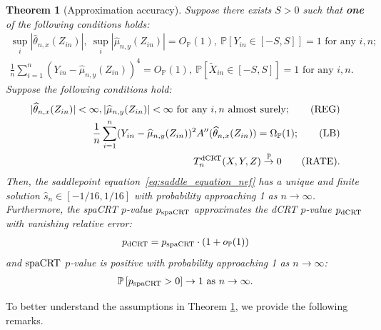\documentclass[12pt]{article}
\newtheorem{theorem}{Theorem}
\theoremstyle{definition}
\def\P{\mathbb{P}}
\def\P{\mathbb{P}}
\renewcommand{\P}{\mathbb{P}}							%
\newcommand{\convp}{\overset{\mathbb{P}}{\rightarrow}}             %
\newcommand{\srx}{X}									%
\newcommand{\srz}{Z}									%
\newcommand{\srxk}{\widetilde X}						%
\newcommand{\sry}{Y}									%
\newcommand{\dCRT}{\textnormal{dCRT}} 					%
\newcommand{\spacrt}{\textnormal{spaCRT}}               %
\begin{document}
\begin{theorem}[Approximation accuracy]\label{thm:validity_spacrt}
  Suppose there exists $S>0$ such that \textbf{one} of the following conditions holds:
  \begin{align}
    \sup_{i}|\widehat{\theta}_{n,x}(\srz_{in})|,\ \sup_{i}|\widehat{\mu}_{n,y}(\srz_{in})| = O_{\P}(1),\  \P[\sry_{in}\in [-S,S]]=1\text{ for any }i,n\label{eq:cse_assumption}\tag{CSE};\\
    \frac{1}{n}\sum_{i=1}^n (\sry_{in}-\widehat{\mu}_{n,y}(\srz_{in}))^4=O_{\P}(1),\ \P\left[\srxk_{in}\in [-S,S]\right]=1\text{ for any }i,n\label{eq:ccs_assumption}\tag{CCS}.
  \end{align}
	Suppose the following conditions hold:
	\begin{align}
		|\widehat \theta_{n,x}(\srz_{in})|<\infty,|\widehat \mu_{n,y}(\srz_{in})|<\infty\text{ for any $i,n$ almost surely};\label{eq:upper_bound_theta_a} \tag{REG}\\
		\frac{1}{n}\sum_{i=1}^n (Y_{in}-\widehat{\mu}_{n,y}(Z_{in}))^2 A''(\widehat \theta_{n,x}(\srz_{in}))=\Omega_{\P}(1);\label{eq:lower_bound_spacrt}\tag{LB}\\
		T_n^{\dCRT}(\srx,\sry,\srz)\convp 0\label{eq:x_n_convergence_spacrt}\tag{RATE}.
	\end{align}
	Then, the saddlepoint equation~\eqref{eq:saddle_equation_nef} has a unique and finite solution $\hat s_n \in [-1/16, 1/16]$ with probability approaching 1 as $n \rightarrow \infty$. Furthermore, the spaCRT $p$-value $p_{\spacrt}$ approximates the dCRT $p$-value $p_{\dCRT}$ with vanishing relative error:
	\begin{align}\label{eq:approximation_accuracy_spacrt}
		p_{\dCRT} = p_{\spacrt}\cdot (1+o_\P(1))
	\end{align}
  and $\spacrt$ $p$-value is positive with probability approaching 1 as $n\rightarrow\infty$:
  \begin{align}\label{eq:spacrt_pvalue_positivity}
    \P\left[p_{\spacrt}>0\right]\rightarrow1 \text{ as }n\rightarrow\infty.
  \end{align}
\end{theorem}

\noindent To better understand the assumptions in Theorem \ref{thm:validity_spacrt}, we provide the following remarks.
\end{document}
